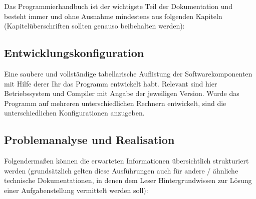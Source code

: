 \documentclass[12pt, letterpaper]{article}
\begin{document}
        Das Programmierhandbuch ist der wichtigste Teil der Dokumentation und besteht immer und ohne Ausnahme mindestens aus folgenden Kapiteln (Kapitelüberschriften sollten genauso beibehalten werden):

        \subsection{Entwicklungskonfiguration}
            Eine saubere und vollständige tabellarische Auflistung der Softwarekomponenten mit Hilfe derer Ihr das Programm entwickelt habt. Relevant sind hier Betriebssystem und Compiler mit Angabe der jeweiligen Version. Wurde das Programm auf mehreren unterschiedlichen Rechnern entwickelt, sind die unterschiedlichen Konfigurationen anzugeben.
        
        \subsection{Problemanalyse und Realisation}
            Folgendermaßen können die erwarteten Informationen übersichtlich strukturiert werden (grundsätzlich gelten diese Ausführungen auch für andere / ähnliche technische Dokumentationen, in denen dem Leser Hintergrundwissen zur Lösung einer Aufgabenstellung vermittelt werden soll):
\end{document}
